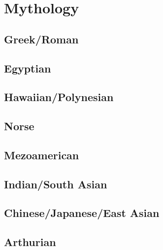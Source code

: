 \chapter{Mythology}
	\section{Greek/Roman}
	\section{Egyptian}
	\section{Hawaiian/Polynesian}
	\section{Norse}
	\section{Mezoamerican}
	\section{Indian/South Asian}
	\section{Chinese/Japanese/East Asian}
	\section{Arthurian}
